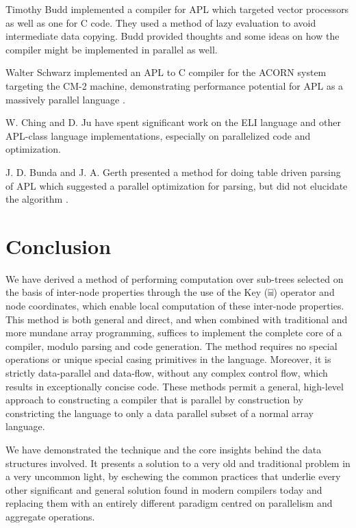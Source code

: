 \documentclass[numbers,preprint]{sigplanconf}
\begin{document}
Timothy Budd implemented a compiler \cite{budd1984apl,budd2012apl} for APL which targeted
vector processors as well as one for C code. They used a method of
lazy evaluation to avoid intermediate data copying. Budd provided
thoughts and some ideas on how the compiler might be implemented in
parallel as well.

Walter Schwarz implemented an APL to C compiler for the ACORN system
targeting the CM-2 machine, demonstrating performance potential for
APL as a massively parallel language \cite{schwarz1991acorn}.

W. Ching and D. Ju have spent significant work on the ELI language
and other APL-class language
 implementations, especially on parallelized code and optimization. 
\cite{ching2000design,ching1994experimental,ching1993primitive,
ching1990automatic,hendriks1990sparse,ju1991exploitation,
ju1991performance}

J. D. Bunda and J. A. Gerth presented a method for doing table driven
parsing of APL which suggested a parallel optimization for parsing,
but did not elucidate the algorithm \cite{bunda1984apl}.

\section{Conclusion}

We have derived a method of performing computation over sub-trees
selected on the basis of inter-node properties through the use of the
Key (⌸) operator and node coordinates, which enable local computation
of these inter-node properties. This method is both general and direct,
and when combined with traditional and more mundane array programming,
suffices to implement the complete core of a compiler, modulo parsing
and code generation. The method requires no special operations or
unique special casing primitives in the language. Moreover, it is
strictly data-parallel and data-flow, without any complex control flow,
which results in exceptionally concise code. These methods permit a 
general, high-level approach to constructing a compiler that is 
parallel by construction by constricting the language to only a data parallel 
subset of a normal array language. 

We have demonstrated the technique and the core insights behind the
data structures involved. It presents a solution to a very old and
traditional problem in a very uncommon light, by eschewing the common
practices that underlie every other significant and general solution
found in modern compilers today and replacing them with an entirely
different paradigm centred on parallelism and aggregate operations.
\end{document}
